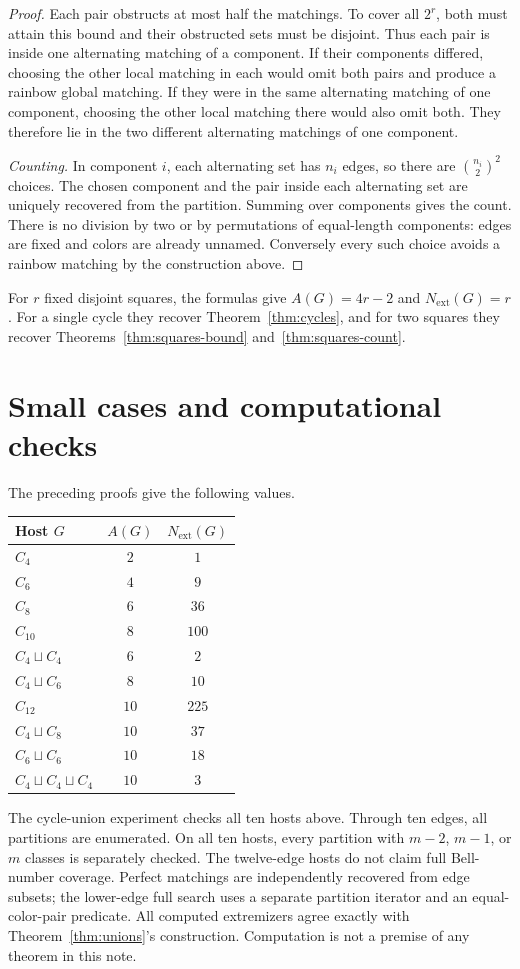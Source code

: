 \documentclass[11pt,letterpaper]{article}
\newcommand{\Next}{N_{\mathrm{ext}}}
\begin{document}
\begin{proof}
Each pair obstructs at most half the matchings. To cover all $2^r$, both
must attain this bound and their obstructed sets must be disjoint. Thus
each pair is inside one alternating matching of a component. If their
components differed, choosing the other local matching in each would omit
both pairs and produce a rainbow global matching. If they were in the same
alternating matching of one component, choosing the other local matching
there would also omit both. They therefore lie in the two different
alternating matchings of one component.

\emph{Counting.} In component $i$, each alternating set has $n_i$ edges,
so there are $\binom{n_i}{2}^2$ choices. The chosen component and the pair
inside each alternating set are uniquely recovered from the partition.
Summing over components gives the count. There is no division by two or
by permutations of equal-length components: edges are fixed and colors
are already unnamed. Conversely every such choice avoids a rainbow
matching by the construction above.
\end{proof}

For $r$ fixed disjoint squares, the formulas give $A(G)=4r-2$ and
$\Next(G)=r$. For a single cycle they recover Theorem~\ref{thm:cycles},
and for two squares they recover Theorems~\ref{thm:squares-bound}
and~\ref{thm:squares-count}.

\newpage
\section{Small cases and computational checks}
The preceding proofs give the following values.
\begin{center}
\renewcommand{\arraystretch}{1.15}
\begin{tabular}{@{}lcc@{}}
\toprule
Host $G$ & $A(G)$ & $\Next(G)$ \\
\midrule
$C_4$ & $2$ & $1$ \\
$C_6$ & $4$ & $9$ \\
$C_8$ & $6$ & $36$ \\
$C_{10}$ & $8$ & $100$ \\
$C_4\sqcup C_4$ & $6$ & $2$ \\
$C_4\sqcup C_6$ & $8$ & $10$ \\
$C_{12}$ & $10$ & $225$ \\
$C_4\sqcup C_8$ & $10$ & $37$ \\
$C_6\sqcup C_6$ & $10$ & $18$ \\
$C_4\sqcup C_4\sqcup C_4$ & $10$ & $3$ \\
\bottomrule
\end{tabular}
\end{center}
The cycle-union experiment checks all ten hosts above. Through ten edges,
all partitions are enumerated. On all ten hosts, every partition with
$m-2$, $m-1$, or $m$ classes is separately checked. The twelve-edge hosts
do not claim full Bell-number coverage. Perfect matchings are independently
recovered from edge subsets; the lower-edge full search uses a separate
partition iterator and an equal-color-pair predicate. All computed
extremizers agree exactly with Theorem~\ref{thm:unions}'s construction.
Computation is not a premise of any theorem in this note.
\end{document}

